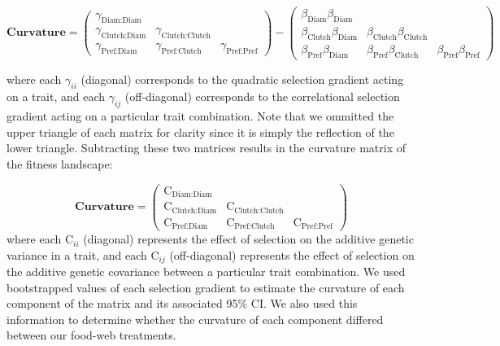 \documentclass[11pt,]{article}
\begin{document}
\[\textbf{Curvature} = \begin{pmatrix} \gamma_{\text{Diam:Diam}}&& \\ \gamma_{\text{Clutch:Diam}}&\gamma_{\text{Clutch:Clutch}}& \\ \gamma_{\text{Pref:Diam}} & \gamma_{\text{Pref:Clutch}} &\gamma_{\text{Pref:Pref}} \end{pmatrix} - \begin{pmatrix} \beta_{\text{Diam}}\beta_{\text{Diam}}&& \\ \beta_{\text{Clutch}}\beta_{\text{Diam}}&\beta_{\text{Clutch}}\beta_{\text{Clutch}}& \\ \beta_{\text{Pref}}\beta_{\text{Diam}} & \beta_{\text{Pref}}\beta_{\text{Clutch}} &\beta_{\text{Pref}}\beta_{\text{Pref}} \end{pmatrix}\]

where each \(\gamma_{ii}\) (diagonal) corresponds to the quadratic
selection gradient acting on a trait, and each \(\gamma_{ij}\)
(off-diagonal) corresponds to the correlational selection gradient
acting on a particular trait combination. Note that we ommitted the
upper triangle of each matrix for clarity since it is simply the
reflection of the lower triangle. Subtracting these two matrices results
in the curvature matrix of the fitness landscape:

\[\textbf{Curvature} = \begin{pmatrix} \text{C}_{\text{Diam:Diam}}&& \\ \text{C}_{\text{Clutch:Diam}} & \text{C}_{\text{Clutch:Clutch}} & \\ \text{C}_{\text{Pref:Diam}} & \text{C}_{\text{Pref:Clutch}} & \text{C}_{\text{Pref:Pref}} \end{pmatrix}\]
where each \(\text{C}_{ii}\) (diagonal) represents the effect of
selection on the additive genetic variance in a trait, and each
\(\text{C}_{ij}\) (off-diagonal) represents the effect of selection on
the additive genetic covariance between a particular trait combination.
We used bootstrapped values of each selection gradient to estimate the
curvature of each component of the matrix and its associated 95\% CI. We
also used this information to determine whether the curvature of each
component differed between our food-web treatments.
\end{document}
